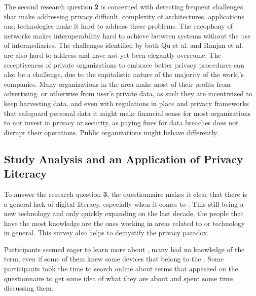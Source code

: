 The second research question \textbf{\hyperlink{\acronym}{\acronym}2} is concerned with detecting frequent
challenges that make addressing \hyperlink{\acronym}{\acronym} privacy difficult. \hyperlink{\acronym}{\acronym} complexity of architectures,
applications and technologies make it hard to address these problems. The
cacophony of networks makes interoperability hard to achieve between \hyperlink{\acronym}{\acronym} systems
without the use of intermediaries. The challenges identified by both Qu et
al. \cite{Qu2018Privacy} and Ranjan et al. \cite{perera2015big} are also hard
to address and have not yet been elegantly overcome.
The receptiveness of private organizations to embrace better privacy procedures
can also be a challenge, due to the capitalistic nature of the majority of the
world's companies. Many organizations in the \hyperlink{\acronym}{\acronym} area make most of their profits
from advertising, or otherwise from user's private data, as such they are incentivized
to keep harvesting data, and even with regulations in place and privacy frameworks
that safeguard personal data it might make financial sense for most organizations
to not invest in privacy or security, as paying fines for data breaches does not
disrupt their operations. Public organizations might behave differently.

\subsection{Study Analysis and an Application of Privacy Literacy}\label{subsection:study_analysis_and_an_application_of_privacy_literacy}

To answer the research question \textbf{\hyperlink{\acronym}{\acronym}3}, the questionnaire makes it clear that there is
a general lack of digital literacy, especially when it comes to \hyperlink{\acronym}{\acronym}.
This still being a new technology and only quickly expanding
on the last decade, the people that have the most knowledge are the
ones working in areas related to \hyperlink{\acronym}{\acronym} or technology in general.
This survey also helps to demystify the privacy paradox.

Participants seemed eager to learn more about \hyperlink{\acronym}{\acronym}, many had no
knowledge of the term, even if some of them knew some devices
that belong to the \hyperlink{\acronym}{\acronym}. Some participants took the time to search
online about terms that appeared on the questionnaire to get some
idea of what they are about and spent some time discussing them.

